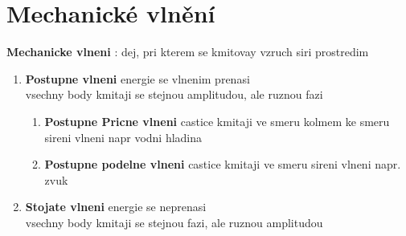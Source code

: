 \documentclass{report}
\begin{document}

\section{Mechanické vlnění}
\vspace{0.5cm}
\textbf{Mechanicke vlneni} : dej, pri kterem se kmitovay vzruch siri prostredim \\
\begin{enumerate}[label=\bfseries\tiny\protect\circled{\small\arabic*}]
  \item \textbf{Postupne vlneni} energie se vlnenim prenasi \\
    vsechny body kmitaji se stejnou amplitudou, ale ruznou fazi

    \begin{enumerate}[label=\bfseries\tiny\protect\circled{\small\arabic*}]
      \item \textbf{Postupne Pricne vlneni} castice kmitaji ve smeru kolmem ke smeru sireni vlneni napr vodni hladina
      \item \textbf{Postupne podelne vlneni} castice kmitaji ve smeru sireni vlneni napr. zvuk
    \end{enumerate}

  \item \textbf{Stojate vlneni} energie se neprenasi \\
    vsechny body kmitaji se stejnou fazi, ale ruznou amplitudou
\end{enumerate}
\end{document}
